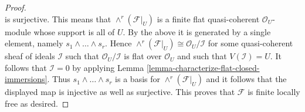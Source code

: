 \documentclass[10pt,a4paper]{amsart}
\theoremstyle{plain}
\theoremstyle{definition}
\theoremstyle{remark}
\numberwithin{equation}{subsection}
\begin{document}
\begin{proof}
$$$$
is surjective. This means that
$\wedge^r(\mathcal{F}|_U)$ is a finite flat quasi-coherent
$\mathcal{O}_U$-module whose support is all of $U$.
By the above it is generated by a single element, namely
$s_1 \wedge \ldots \wedge s_r$. Hence
$\wedge^r(\mathcal{F}|_U) \cong \mathcal{O}_U/\mathcal{I}$
for some quasi-coherent sheaf of ideals $\mathcal{I}$
such that $\mathcal{O}_U/\mathcal{I}$ is flat over $\mathcal{O}_U$ and
such that $V(\mathcal{I}) = U$.
It follows that $\mathcal{I} = 0$ by applying
Lemma \ref{lemma-characterize-flat-closed-immersions}.
Thus $s_1 \wedge \ldots \wedge s_r$ is a basis for
$\wedge^r(\mathcal{F}|_U)$ and it follows that the displayed map is injective
as well as surjective. This proves that $\mathcal{F}$ is finite locally free
as desired.
\end{proof}
\end{document}
